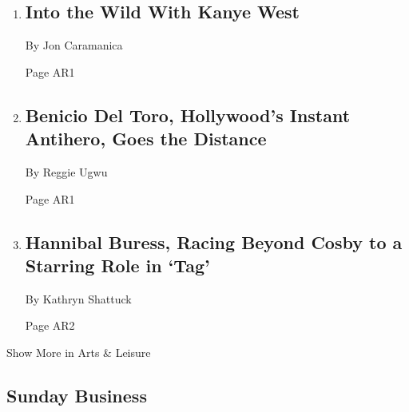 \begin{enumerate}
\def\labelenumi{\arabic{enumi}.}
\item
  \href{/2018/06/25/arts/music/kanye-west-ye-interview.html}{}

  \hypertarget{into-the-wild-with-kanye-west}{%
  \subsection{Into the Wild With Kanye
  West}\label{into-the-wild-with-kanye-west}}

  By Jon Caramanica

  Page AR1
\item
  \href{/2018/06/27/movies/benicio-del-toro-sicario-day-of-the-soldado.html}{}

  \hypertarget{benicio-del-toro-hollywoods-instant-antihero-goes-the-distance}{%
  \subsection{Benicio Del Toro, Hollywood's Instant Antihero, Goes the
  Distance}\label{benicio-del-toro-hollywoods-instant-antihero-goes-the-distance}}

  By Reggie Ugwu

  Page AR1
\item
  \href{/2018/06/14/movies/hannibal-buress-tag.html}{}

  \hypertarget{hannibal-buress-racing-beyond-cosby-to-a-starring-role-in-tag}{%
  \subsection{Hannibal Buress, Racing Beyond Cosby to a Starring Role in
  `Tag'}\label{hannibal-buress-racing-beyond-cosby-to-a-starring-role-in-tag}}

  By Kathryn Shattuck

  Page AR2
\end{enumerate}

Show More in Arts \& Leisure

\hypertarget{sunday-business}{%
\subsection{Sunday Business}\label{sunday-business}}


